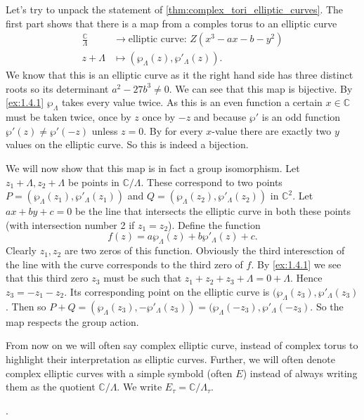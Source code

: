 \documentclass[a4paper]{article}
\theoremstyle{theoremdd}
\theoremstyle{definitiondd}
\theoremstyle{remarkdd}
\newcommand{\C}{\mathbb{C}}
\begin{document}
Let's try to unpack the statement of \cref{thm:complex_tori_elliptic_curves}.
The first part shows that there is a map from a comples torus to an elliptic curve 
\begin{align*}
	\frac{\C}{\Lambda} &\longrightarrow \text{elliptic curve: } Z(x^3 - a x - b -y ^2) \\
	z+\Lambda &\longmapsto \left(\wp_\Lambda(z), \wp'_\Lambda(z)\right)
.\end{align*}
We know that this is an elliptic curve as it the right hand side has three distinct roots so its determinant $a^2 - 27 b^3 \ne 0  $.
We can see that this map is bijective. By \cref{ex:1.4.1}  $\wp_\Lambda$  takes every value twice. As this is an even function a certain $x \in \C$ must be taken twice, once by $z$ once by $-z$ and because $\wp'$ is an odd function $\wp'(z) \ne \wp'(-z)$ unless $z = 0$.  By for every $x$-value there are exactly two $y$ values on the elliptic curve. So this is indeed a bijection. 

We will now show that this map is in fact a group isomorphism.
Let $z_1 + \Lambda, z_2 + \Lambda$ be points in $\C / \Lambda$.
These correspond to two points $P = (\wp_{\Lambda}(z_1), \wp'_\Lambda(z_1))$ and $ Q = (\wp_{\Lambda}(z_2), \wp'_\Lambda(z_2))$ in $\C^2$. 
Let $ax + by + c = 0$ be the line that intersects the elliptic curve in both these points (with intersection number 2 if  $z_1 = z_2$).
Define the function \[
	f(z) = a \wp_{\Lambda}(z) + b \wp'_\Lambda(z) + c
.\] 
Clearly $z_1, z_2$ are two zeros of this function. Obviously the third interesction of the line with the curve corresponds to the third zero of $f$. 
By \cref{ex:1.4.1} we see that this third zero $z_3$ must be such that $z_1 + z_2 + z_3 + \Lambda = 0 + \Lambda$. 
Hence $z_3 = - z_1 - z_2$. Its corresponding point on the elliptic curve is 
$(\wp_\Lambda(z_3), \wp'_\Lambda(z_3)$. Then so $P + Q = (\wp_\Lambda(z_3), - \wp'_\Lambda(z_3)) = (\wp_\Lambda(-z_3), \wp'_\Lambda(-z_3)$. 
So the map respects the group action. 


From now on we will often say complex elliptic curve, instead of complex torus to highlight their interpretation as elliptic curves. Further, we will often denote complex elliptic curves with a simple symbold (often $E$) instead of always writing them as the quotient  $\C / \Lambda$. We write $E_\tau  = \C / \Lambda_\tau$.

.
\end{document}
